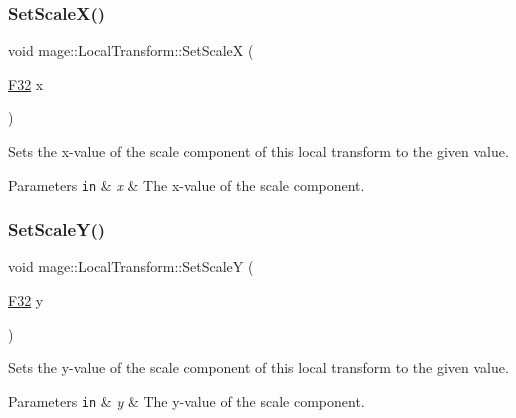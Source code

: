 \subsubsection{\texorpdfstring{Set\+Scale\+X()}{SetScaleX()}}
{\footnotesize\ttfamily void mage\+::\+Local\+Transform\+::\+Set\+ScaleX (\begin{DoxyParamCaption}\item[{\mbox{\hyperlink{namespacemage_aa97e833b45f06d60a0a9c4fc22ae02c0}{F32}}}]{x }\end{DoxyParamCaption})\hspace{0.3cm}{\ttfamily [noexcept]}}

Sets the x-\/value of the scale component of this local transform to the given value.


\begin{DoxyParams}[1]{Parameters}
\mbox{\tt in}  & {\em x} & The x-\/value of the scale component. \\
\hline
\end{DoxyParams}
\mbox{\label{classmage_1_1_local_transform_a17297480169c047f0a08c2022b69fc42}} 
\subsubsection{\texorpdfstring{Set\+Scale\+Y()}{SetScaleY()}}
{\footnotesize\ttfamily void mage\+::\+Local\+Transform\+::\+Set\+ScaleY (\begin{DoxyParamCaption}\item[{\mbox{\hyperlink{namespacemage_aa97e833b45f06d60a0a9c4fc22ae02c0}{F32}}}]{y }\end{DoxyParamCaption})\hspace{0.3cm}{\ttfamily [noexcept]}}

Sets the y-\/value of the scale component of this local transform to the given value.


\begin{DoxyParams}[1]{Parameters}
\mbox{\tt in}  & {\em y} & The y-\/value of the scale component. \\
\hline
\end{DoxyParams}
\mbox{\label{classmage_1_1_local_transform_a076673ed934cc2b92febfd5477e81e75}} 
